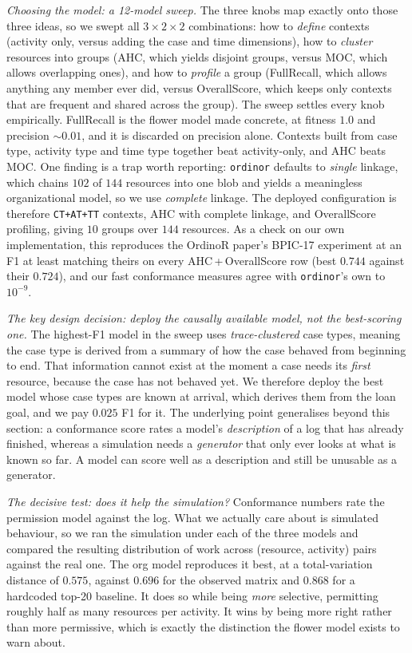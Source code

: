 \emph{Choosing the model: a 12-model sweep.} The three knobs map exactly onto
those three ideas, so we swept all $3\times2\times2$ combinations: how to
\emph{define} contexts (activity only, versus adding the case and time
dimensions), how to \emph{cluster} resources into groups (AHC, which yields
disjoint groups, versus MOC, which allows overlapping ones), and how to
\emph{profile} a group (FullRecall, which allows anything any member ever did,
versus OverallScore, which keeps only contexts that are frequent and shared
across the group). The sweep settles every knob empirically. FullRecall is the
flower model made concrete, at fitness $1.0$ and precision $\sim\!0.01$, and it
is discarded on precision alone. Contexts built from case type, activity type
and time type together beat activity-only, and AHC beats MOC. One finding is a
trap worth reporting: \texttt{ordinor} defaults to \emph{single} linkage, which
chains $102$ of $144$ resources into one blob and yields a meaningless
organizational model, so we use \emph{complete} linkage. The deployed
configuration is therefore \texttt{CT+AT+TT} contexts, AHC with complete
linkage, and OverallScore profiling, giving $10$ groups over $144$ resources.
As a check on our own implementation, this reproduces the OrdinoR paper's
BPIC-17 experiment at an F1 at least matching theirs on every
AHC\,+\,OverallScore row (best $0.744$ against their $0.724$), and our fast
conformance measures agree with \texttt{ordinor}'s own to $10^{-9}$.

\emph{The key design decision: deploy the causally available model, not the
best-scoring one.} The highest-F1 model in the sweep uses \emph{trace-clustered}
case types, meaning the case type is derived from a summary of how the case
behaved from beginning to end. That information cannot exist at the moment a
case needs its \emph{first} resource, because the case has not behaved yet. We
therefore deploy the best model whose case types are known at arrival, which
derives them from the loan goal, and we pay $0.025$ F1 for it. The underlying
point generalises beyond this section: a conformance score rates a model's
\emph{description} of a log that has already finished, whereas a simulation
needs a \emph{generator} that only ever looks at what is known so far. A model
can score well as a description and still be unusable as a generator.

\emph{The decisive test: does it help the simulation?} Conformance numbers rate
the permission model against the log. What we actually care about is simulated
behaviour, so we ran the simulation under each of the three models and compared
the resulting distribution of work across (resource, activity) pairs against
the real one. The org model reproduces it best, at a total-variation distance
of $0.575$, against $0.696$ for the observed matrix and $0.868$ for a hardcoded
top-20 baseline. It does so while being \emph{more} selective, permitting
roughly half as many resources per activity. It wins by being more right rather
than more permissive, which is exactly the distinction the flower model exists
to warn about.

